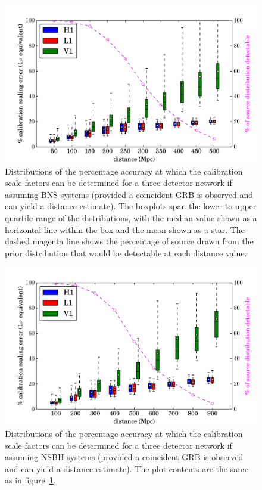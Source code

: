 \documentclass[10pt]{iopart}
\begin{document}
\begin{figure}
 \begin{center}
  \includegraphics[width=1.0\textwidth]{scale_factor.pdf}
 \end{center}
 \caption{\label{fig:bnsresults} Distributions of the percentage accuracy at which the calibration 
scale factors can be determined for a three detector network if assuming \ac{BNS} systems (provided 
a coincident \ac{GRB} is observed and can yield a distance estimate). The boxplots span the lower 
to upper quartile range of the distributions, with the median value shown as a horizontal line 
within the box and the mean shown as a star. The dashed magenta line shows the percentage of source 
drawn from the prior distribution that would be detectable at each distance value.}
\end{figure}

\begin{figure}
 \begin{center}
  \includegraphics[width=1.0\textwidth]{scale_factor_nsbh.pdf}
 \end{center}
 \caption{\label{fig:nsbhresults} Distributions of the percentage accuracy at which the calibration 
scale factors can be determined for a three detector network if assuming \ac{NSBH} systems 
(provided a coincident \ac{GRB} is observed and can yield a distance estimate). The plot contents 
are the same as in figure~\ref{fig:bnsresults}.}
\end{figure}
\end{document}
